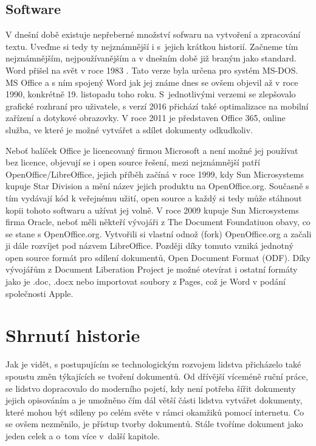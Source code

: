 \subsection{Software}

V dnešní době existuje nepřeberné množství sofwaru na vytvoření a zpracování textu. Uveďme si tedy ty nejznámnější i s~jejich krátkou historií. Začneme
tím nejznámnějším, nejpoužívanějším a v dnešním době již braným jako standard. Word přišel na svět v roce 1983 \cite{word83}. Tato verze byla určena pro systém MS-DOS.
MS Office a s ním spojený Word jak jej známe dnes se ovšem objevil až v roce 1990, konkrétně 19. listopadu toho roku. S~jednotlivými verzemi se zlepšovalo grafické
rozhraní pro uživatele, s verzí 2016 přichází také optimalizace na mobilní zařízení a dotykové obrazovky. V roce 2011 je představen Office 365, online služba, ve
které je možné vytvářet a sdílet dokumenty odkudkoliv. \cite{word}

Neboť balíček Office je licencovaný firmou Microsoft a není možné jej používat bez licence, objevují se i open source řešení, mezi nejznámnější patří OpenOffice/LibreOffice,
jejich příběh začíná v roce 1999, kdy Sun Microsystems kupuje Star Division a mění název jejich produktu na OpenOffice.org. Současně s tím vydávají kód k veřejnému užití, open source a
každý si tedy může stáhnout kopii tohoto softwaru a užívat jej volně. V roce 2009 kupuje Sun Microsystems firma Oracle, neboť měli někteří vývojáři z The Document Foundatiuon obavy,
co se stane s OpenOffice.org. Vytvořili si vlastní odnož (fork) OpenOffice.org a začali ji dále rozvíjet pod názvem LibreOffice. Později díky tomuto vzniká jednotný open source
formát pro sdílení dokumentů, Open Document Format (ODF). Díky vývojářům z Document Liberation Project je možné otevírat i ostatní formáty jako je .doc, .docx nebo importovat
soubory z Pages, což je Word v podání společnosti Apple. \cite{LibreHist}

\section{Shrnutí historie}

Jak je vidět, s postupujícím se technologickým rozvojem lidstva přicházelo také spoustu změn týkajících se tvoření dokumentů. Od dřívější víceméně ruční práce, se lidstvo dopracovalo do moderního pojetí, kdy není potřeba šířit dokumenty jejich opisováním a je
umožněno čím dál větší části lidstva vytvářet dokumenty,
které mohou být sdíleny po celém světe v rámci okamžiků pomocí internetu. Co se ovšem nezměnilo, je přístup tvorby dokumentů. Stále tvoříme dokument jako jeden celek a o~tom více v~další kapitole.